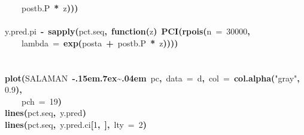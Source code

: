 \documentclass{article}
\makeatletter
\newcommand{\hlnumber}[1]{\textcolor[rgb]{0,0,0}{#1}}%
\newcommand{\hlfunctioncall}[1]{\textcolor[rgb]{.5,0,.33}{\textbf{#1}}}%
\newcommand{\hlstring}[1]{\textcolor[rgb]{.6,.6,1}{#1}}%
\newcommand{\hlkeyword}[1]{\textbf{#1}}%
\newcommand{\hlargument}[1]{\textcolor[rgb]{.69,.25,.02}{#1}}%
\newcommand{\hlformalargs}[1]{\hlargument{#1}}%
\newcommand{\hlassignement}[1]{\textbf{#1}}%
\newcommand{\hlsymbol}[1]{#1}%
\def\urltilda{\kern -.15em\lower .7ex\hbox{\~{}}\kern .04em}%
\newcommand{\hlstd}[1]{\textcolor[rgb]{0,0,0}{#1}}%
\newenvironment{kframe}{%
 \def\FrameCommand##1{\hskip\@totalleftmargin \hskip-\fboxsep
 \colorbox{shadecolor}{##1}\hskip-\fboxsep
     \hskip-\linewidth \hskip-\@totalleftmargin \hskip\columnwidth}%
 \MakeFramed {\advance\hsize-\width
   \@totalleftmargin\z@ \linewidth\hsize
   \@setminipage}}%
 {\par\unskip\endMakeFramed}
\newenvironment{knitrout}{}{} %
\makeatother
\begin{document}
\begin{knitrout}
{\begin{kframe}
\begin{flushleft}
\hlstd{}{\ }{\ }{\ }{\ }\hlsymbol{post}\hlkeyword{\usebox{\hlnormalsizeboxdollar}}\hlsymbol{b.P}{\ }\hlkeyword{*}{\ }\hlsymbol{z}\hlkeyword{)}\hlkeyword{)}\hlkeyword{)}\hspace*{\fill}\\
\hlstd{}\hspace*{\fill}\\
\hlstd{}\hlsymbol{y.pred.pi}{\ }\hlassignement{\usebox{\hlnormalsizeboxlessthan}-}{\ }\hlfunctioncall{sapply}\hlkeyword{(}\hlsymbol{pct.seq}\hlkeyword{,}{\ }\hlkeyword{function}\hlkeyword{(}\hlformalargs{z}\hlkeyword{)}{\ }\hlfunctioncall{PCI}\hlkeyword{(}\hlfunctioncall{rpois}\hlkeyword{(}\hlargument{n}{\ }\hlargument{=}{\ }\hlnumber{30000}\hlkeyword{,}\hspace*{\fill}\\
\hlstd{}{\ }{\ }{\ }{\ }\hlargument{lambda}{\ }\hlargument{=}{\ }\hlfunctioncall{exp}\hlkeyword{(}\hlsymbol{post}\hlkeyword{\usebox{\hlnormalsizeboxdollar}}\hlsymbol{a}{\ }\hlkeyword{+}{\ }\hlsymbol{post}\hlkeyword{\usebox{\hlnormalsizeboxdollar}}\hlsymbol{b.P}{\ }\hlkeyword{*}{\ }\hlsymbol{z}\hlkeyword{)}\hlkeyword{)}\hlkeyword{)}\hlkeyword{)}\hspace*{\fill}\\
\hlstd{}\hspace*{\fill}\\
\hlstd{}\hspace*{\fill}\\
\hlstd{}\hlfunctioncall{plot}\hlkeyword{(}\hlsymbol{SALAMAN}{\ }\hlkeyword{\urltilda{}}{\ }\hlsymbol{pc}\hlkeyword{,}{\ }\hlargument{data}{\ }\hlargument{=}{\ }\hlsymbol{d}\hlkeyword{,}{\ }\hlargument{col}{\ }\hlargument{=}{\ }\hlfunctioncall{col.alpha}\hlkeyword{(}\hlstring{"gray"}\hlkeyword{,}{\ }\hlnumber{0.9}\hlkeyword{)}\hlkeyword{,}\hspace*{\fill}\\
\hlstd{}{\ }{\ }{\ }{\ }\hlargument{pch}{\ }\hlargument{=}{\ }\hlnumber{19}\hlkeyword{)}\hspace*{\fill}\\
\hlstd{}\hlfunctioncall{lines}\hlkeyword{(}\hlsymbol{pct.seq}\hlkeyword{,}{\ }\hlsymbol{y.pred}\hlkeyword{)}\hspace*{\fill}\\
\hlstd{}\hlfunctioncall{lines}\hlkeyword{(}\hlsymbol{pct.seq}\hlkeyword{,}{\ }\hlsymbol{y.pred.ci}\hlkeyword{[}\hlnumber{1}\hlkeyword{,}{\ }\hlkeyword{]}\hlkeyword{,}{\ }\hlargument{lty}{\ }\hlargument{=}{\ }\hlnumber{2}\hlkeyword{)}\hspace*{\fill}\\

\end{flushleft}
\end{kframe}}
\end{knitrout}
\end{document}
